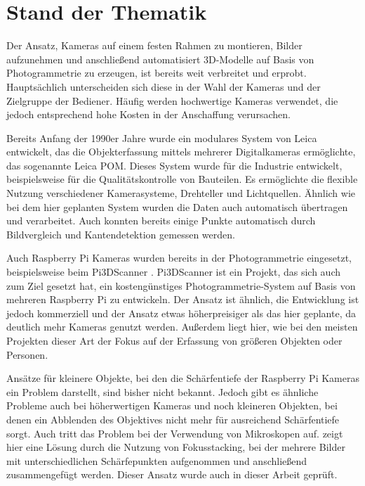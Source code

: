 \documentclass[./00PhotoBox]{subfiles}
\begin{document}
\section{Stand der Thematik}
Der Ansatz, Kameras auf einem festen Rahmen zu montieren, Bilder aufzunehmen und anschließend automatisiert 3D-Modelle auf Basis von Photogrammetrie zu erzeugen, ist bereits weit verbreitet und erprobt. Hauptsächlich unterscheiden sich diese in der Wahl der Kameras und der Zielgruppe der Bediener. Häufig werden hochwertige Kameras verwendet, die jedoch entsprechend hohe Kosten in der Anschaffung verursachen.

Bereits Anfang der 1990er Jahre wurde ein modulares System von Leica entwickelt, das die Objekterfassung mittels mehrerer Digitalkameras ermöglichte, das sogenannte Leica POM.  Dieses System wurde für die Industrie entwickelt, beispielsweise für die Qualitätskontrolle von Bauteilen. Es ermöglichte die flexible Nutzung verschiedener Kamerasysteme, Drehteller und Lichtquellen. Ähnlich wie bei dem hier geplanten System wurden die Daten auch automatisch übertragen und verarbeitet. Auch konnten bereits einige Punkte automatisch durch Bildvergleich und Kantendetektion gemessen werden.
\citep{leica_pom_concept}

Auch Raspberry Pi Kameras wurden bereits in der Photogrammetrie eingesetzt, beispielsweise beim Pi3DScanner \citep{pi3dscanner}. Pi3DScanner ist ein Projekt, das sich auch zum Ziel gesetzt hat, ein kostengünstiges Photo\-gram\-metrie-System auf Basis von mehreren Raspberry Pi zu entwickeln. Der Ansatz ist ähnlich, die Entwicklung ist jedoch kommerziell und der Ansatz etwas höherpreisiger als das hier geplante, da deutlich mehr Kameras genutzt werden. Außerdem liegt hier, wie bei den meisten Projekten dieser Art der Fokus auf der Erfassung von größeren Objekten oder Personen.
\citep{pi3dscanner}

Ansätze für kleinere Objekte, bei den die Schärfentiefe der Raspberry Pi Kameras ein Problem darstellt, sind bisher nicht bekannt. Jedoch gibt es ähnliche Probleme auch bei höherwertigen Kameras und noch kleineren Objekten, bei denen ein Abblenden des Objektives nicht mehr für ausreichend Schärfentiefe sorgt. Auch tritt das Problem bei der Verwendung von Mikroskopen auf. \cite{focusstack_sfm} zeigt hier eine Lösung durch die Nutzung von Fokusstacking, bei der mehrere Bilder mit unterschiedlichen Schärfepunkten aufgenommen und anschließend zusammengefügt werden. Dieser Ansatz wurde auch in dieser Arbeit geprüft.



\biblio
\end{document}
